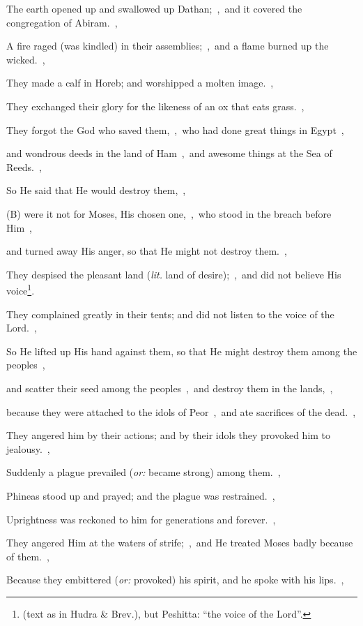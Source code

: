 \documentclass[12pt,twoside,a5paper]{article}
\newcommand{\translationoption}[1]{\emph{or:} #1}
\newcommand{\translationliteral}[1]{\emph{lit.} #1}
\begin{document}
\begin{normalparskip}
  The earth opened up and swallowed up Dathan;~\sep\ and it covered the congregation of Abiram.~\sep

  A fire raged (was kindled) in their assemblies;~\sep\ and a flame burned up the wicked.~\sep

  They made a calf in Horeb; and worshipped a molten image.~\sep

  They exchanged their glory for the likeness of an ox that eats grass.~\sep

  They forgot the God who saved them,~\sep\ who had done great things in Egypt~\sep

  and wondrous deeds in the land of Ham~\sep\ and awesome things at the Sea of Reeds.~\sep

  So He said that He would destroy them,~\sep

  (B) were it not for Moses, His chosen one,~\sep\ who stood in the breach before Him~\sep

  and turned away His anger, so that He might not destroy them.~\sep

  They despised the pleasant land (\translationliteral{land of desire});~\sep\ and did not believe His voice\footnote{(text as in Hudra \& Brev.), but Peshitta: ``the voice of the Lord''.}.

  They complained greatly in their tents; and did not listen to the voice of the Lord.~\sep

  So He lifted up His hand against them, so that He might destroy them among the peoples~\sep

  and scatter their seed among the peoples~\sep\ and destroy them in the lands,~\sep

  because they were attached to the idols of Peor~\sep\ and ate sacrifices of the dead.~\sep

  They angered him by their actions; and by their idols they provoked him to jealousy.~\sep

  Suddenly a plague prevailed (\translationoption{became strong}) among them.~\sep

  Phineas stood up and prayed; and the plague was restrained.~\sep

  Uprightness was reckoned to him for generations and forever.~\sep

  They angered Him at the waters of strife;~\sep\ and He treated Moses badly because of them.~\sep

  Because they embittered (\translationoption{provoked}) his spirit, and he spoke with his lips.~\sep


\end{normalparskip}
\end{document}
